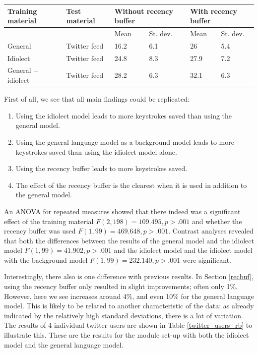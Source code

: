 \documentclass[11pt]{article}
\let\originaltable\table
\let\endoriginaltable\endtable
\renewenvironment{table}[1][ht]{%
  \originaltable[#1]
  \centering}%
  {\endoriginaltable}
\begin{document}
\begin{table}[H] 
\centering
\begin{tabular}{ll|llll} 
Training material&Test material&\multicolumn{2}{l}{Without recency buffer}&\multicolumn{2}{l}{With recency buffer}\\
\hline
&&Mean&St. dev.&Mean&St. dev.\\
General&Twitter feed&16.2&6.1&26&5.4\\
Idiolect&Twitter feed&24.8&8.3&27.9&7.2\\
General + idiolect&Twitter feed&28.2&6.3&32.1&6.3\\
\end{tabular} 
\caption{Mean percentage of keystrokes saved (\textbf{SKKS}) and standard deviations for all module set-ups.} \label{twitter_results_skks}
\end{table}

First of all, we see that all main findings could be replicated: 

\begin{enumerate}
\item Using the idiolect model leads to more keystrokes saved than using the general model.
\item Using the general language model as a background model leads to more keystrokes saved than using the idiolect model alone.
\item Using the recency buffer leads to more keystrokes saved.
\item The effect of the recency buffer is the clearest when it is used in addition to the general model.
\end{enumerate}

An ANOVA for repeated measures showed that there indeed was a significant effect of the training material $F(2,198) = 109.495, p > .001$ and whether the recency buffer was used $F(1,99) = 469.648, p > .001$. Contrast analyses revealed that both the differences between the results of the general model and the idiolect model $F(1,99) = 41.902, p > .001$ and the idiolect model and the idiolect model with the background model $F(1,99) = 232.140, p > .001$ were significant.

Interestingly, there also is one difference with previous results. In Section \ref{recbuf}, using the recency buffer only resulted in slight improvements; often only 1\%. However, here we see increases around 4\%, and even 10\% for the general language model. This is likely to be related to another characteristic of the data: as already indicated by the relatively high standard deviations, there is a lot of variation. The results of 4 individual twitter users are shown in Table \ref{twitter_users_rb} to illustrate this. These are the results for the module set-up with both the idiolect model and the general language model.
\end{document}
